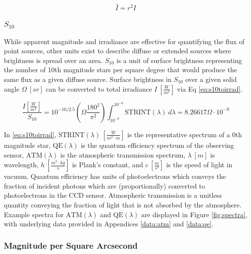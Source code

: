 \begin{equation} \label{eq:irradiance_to_norm_irradiance}
  \hat{I} = r^2 I
\end{equation}

\subsubsection{$S_{10}$}

While apparent magnitude and irradiance are effective for quantifying the flux of point sources, other units exist
to describe diffuse or extended sources where brightness is spread over an
area. $S_{10}$ is a unit of surface brightness representing the number of 10th magnitude stars per square degree that would produce the same flux as a given diffuse source.
Surface brightness in $S_{10}$ over a given solid angle $\Omega \: \left[ sr \right]$ can be converted to total irradiance $I \: \left[ \frac{W}{m^2} \right]$ via Eq \ref{eq:s10toirrad}.

\begin{equation} \label{eq:s10toirrad}
 \frac{I \left[ \frac{W}{m^2} \right]}{S_{10}} = 10^{-10/2.5} \left( \Omega \frac{180^2}{\pi^2} \right)
  \int_{10^{-8}}^{10^{-6}}{ \textrm{STRINT}(\lambda) \: d\lambda} = 8.26617 \Omega \cdot 10^{-9}
\end{equation}

In \ref{eq:s10toirrad}, $\textrm{STRINT}(\lambda) \: \left[ \frac{W}{m^2 \cdot m} \right]$ is the
representative spectrum of a 0th magnitude star, $\textrm{QE}(\lambda)$ is the quantum efficiency
spectrum of the observing sensor, $\textrm{ATM}(\lambda)$ is the atmospheric transmission spectrum, $\lambda \: [m]$ is wavelength, $h \: \left[
\frac{m^2 \cdot kg}{s} \right]$ is Plank's constant, and $c \: \left[ \frac{m}{s^2} \right]$ is the
speed of light in vacuum. Quantum efficiency has units of photoelectrons which conveys the fraction of incident photons which are (proportionally) converted to photoelectrons in the CCD sensor. Atmospheric transmission is a unitless quantity conveying the fraction of light that is not absorbed by the atmosphere. Example spectra for $\textrm{ATM}(\lambda)$ and $\textrm{QE}(\lambda)$ are displayed in Figure \ref{fig:spectra}, with underlying data provided in Appendices \ref{data:atm} and \ref{data:qe}.

\subsubsection{Magnitude per Square Arcsecond}

